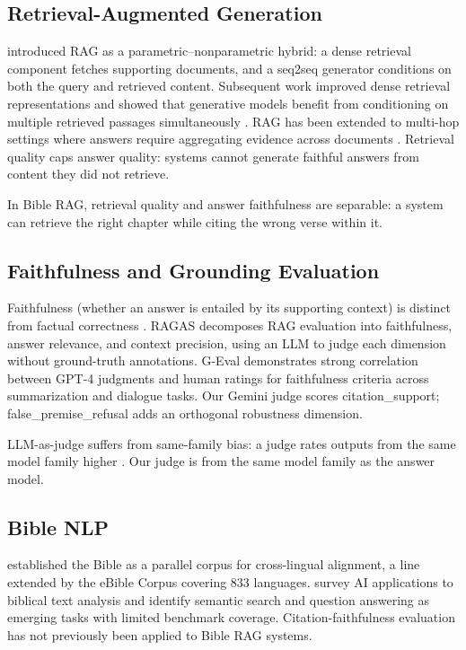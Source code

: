 \documentclass[11pt]{article}
\begin{document}
\subsection{Retrieval-Augmented Generation}

\citet{lewis2020rag} introduced RAG as a parametric--nonparametric hybrid: a dense retrieval component fetches supporting documents, and a seq2seq generator conditions on both the query and retrieved content.
Subsequent work improved dense retrieval representations \citep{karpukhin2020dpr} and showed that generative models benefit from conditioning on multiple retrieved passages simultaneously \citep{izacard2021fid}.
RAG has been extended to multi-hop settings where answers require aggregating evidence across documents \citep{tang2024multihoprag}.
Retrieval quality caps answer quality: systems cannot generate faithful answers from content they did not retrieve.

In Bible RAG, retrieval quality and answer faithfulness are separable: a system can retrieve the right chapter while citing the wrong verse within it.

\subsection{Faithfulness and Grounding Evaluation}

Faithfulness (whether an answer is entailed by its supporting context) is distinct from factual correctness \citep{maynez2020faithfulness}.
RAGAS \citep{es2023ragas} decomposes RAG evaluation into faithfulness, answer relevance, and context precision, using an LLM to judge each dimension without ground-truth annotations.
G-Eval \citep{liu2023geval} demonstrates strong correlation between GPT-4 judgments and human ratings for faithfulness criteria across summarization and dialogue tasks.
Our Gemini judge scores citation\_support; false\_premise\_refusal adds an orthogonal robustness dimension.

LLM-as-judge suffers from same-family bias: a judge rates outputs from the same model family higher \citep{zheng2023judging}.
Our judge is from the same model family as the answer model.

\subsection{Bible NLP}

\citet{resnik1999bible} established the Bible as a parallel corpus for cross-lingual alignment, a line extended by the eBible Corpus \citep{akerman2023ebible} covering 833 languages.
\citet{lima2025aibible} survey AI applications to biblical text analysis and identify semantic search and question answering as emerging tasks with limited benchmark coverage.
Citation-faithfulness evaluation has not previously been applied to Bible RAG systems.
\end{document}
